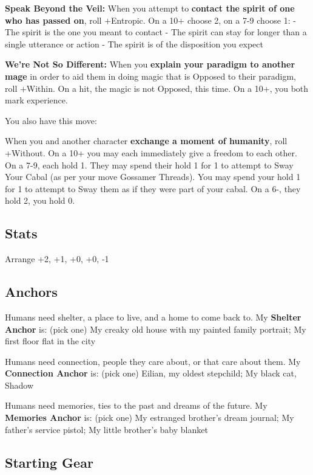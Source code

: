 \documentclass[
  oneside,
  statementpaper,
  9pt]{memoir}
\begin{document}
\textbf{Speak Beyond the Veil:} When you attempt to \textbf{contact the
spirit of one who has passed on}, roll +Entropic. On a 10+ choose 2, on
a 7-9 choose 1: - The spirit is the one you meant to contact - The
spirit can stay for longer than a single utterance or action - The
spirit is of the disposition you expect

\textbf{We're Not So Different:} When you \textbf{explain your paradigm
to another mage} in order to aid them in doing magic that is Opposed to
their paradigm, roll +Within. On a hit, the magic is not Opposed, this
time. On a 10+, you both mark experience.

You also have this move:

When you and another character \textbf{exchange a moment of humanity},
roll +Without. On a 10+ you may each immediately give a freedom to each
other. On a 7-9, each hold 1. They may spend their hold 1 for 1 to
attempt to Sway Your Cabal (as per your move Gossamer Threads). You may
spend your hold 1 for 1 to attempt to Sway them as if they were part of
your cabal. On a 6-, they hold 2, you hold 0.

\hypertarget{stats-1}{%
\subsection{Stats}\label{stats-1}}

Arrange +2, +1, +0, +0, -1

\hypertarget{anchors}{%
\subsection{Anchors}\label{anchors}}

Humans need shelter, a place to live, and a home to come back to. My
\textbf{Shelter Anchor} is: (pick one) My creaky old house with my
painted family portrait; My first floor flat in the city

Humans need connection, people they care about, or that care about them.
My \textbf{Connection Anchor} is: (pick one) Eilian, my oldest
stepchild; My black cat, Shadow

Humans need memories, ties to the past and dreams of the future. My
\textbf{Memories Anchor} is: (pick one) My estranged brother's dream
journal; My father's service pistol; My little brother's baby blanket

\hypertarget{starting-gear}{%
\subsection{Starting Gear}\label{starting-gear}}
\end{document}
